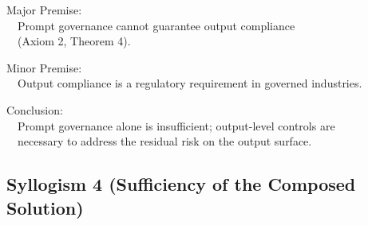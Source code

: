 \begin{claddisp}
Major Premise:\\
~~Prompt governance cannot guarantee output compliance\\
~~(Axiom 2, Theorem 4).
\par\smallskip
Minor Premise:\\
~~Output compliance is a regulatory requirement in governed industries.
\par\smallskip
Conclusion:\\
~~Prompt governance alone is insufficient; output-level controls are\\
~~necessary to address the residual risk on the output surface.
\end{claddisp}


\subsection{Syllogism 4 (Sufficiency of the Composed Solution)}


